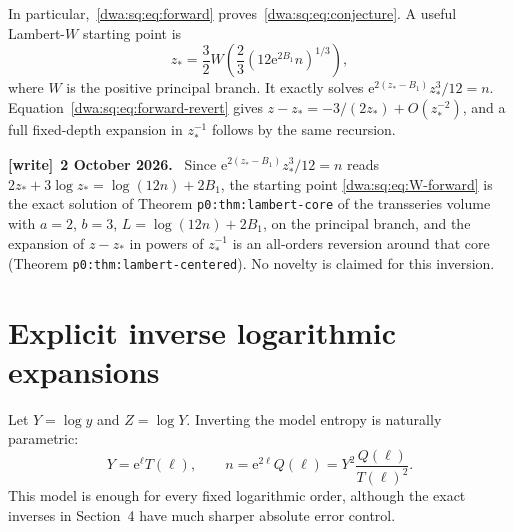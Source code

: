 \documentclass[11pt,letterpaper]{article}
\numberwithin{equation}{section}
\theoremstyle{remark}
\newcommand{\e}{\mathrm e}
\newenvironment{writenote}[1][]{\par\smallskip\begingroup\small
 \noindent\textbf{[write]}\if\relax\detokenize{#1}\relax\else~\textbf{#1.}\fi\ }%
 {\par\endgroup\smallskip}
\begin{document}
In particular,~\eqref{dwa:sq:eq:forward} proves~\eqref{dwa:sq:eq:conjecture}. A useful Lambert-$W$ starting point is
\begin{equation}\label{dwa:sq:eq:W-forward}
 z_* =\frac32 W\left(\frac23(12\e^{2B_1}n)^{1/3}\right),
\end{equation}
where $W$ is the positive principal branch. It exactly solves $\e^{2(z_*-B_1)}z_*^3/12=n$. Equation~\eqref{dwa:sq:eq:forward-revert} gives $z-z_*=-3/(2z_*)+O(z_*^{-2})$, and a full fixed-depth expansion in $z_*^{-1}$ follows by the same recursion.
\begin{writenote}[2 October 2026]
Since $\e^{2(z_*-B_1)}z_*^3/12=n$ reads $2z_*+3\log z_*=\log(12n)+2B_1$, the starting point \eqref{dwa:sq:eq:W-forward} is the exact solution of Theorem \texttt{p0:thm:lambert-core} of the transseries volume with $a=2$, $b=3$, $L=\log(12n)+2B_1$, on the principal branch, and the expansion of $z-z_*$ in powers of $z_*^{-1}$ is an all-orders reversion around that core (Theorem \texttt{p0:thm:lambert-centered}). No novelty is claimed for this inversion.
\end{writenote}

\section{Explicit inverse logarithmic expansions}
Let $Y=\log y$ and $Z=\log Y$. Inverting the model entropy is naturally parametric:
\begin{equation}\label{dwa:sq:eq:inverse-parametric}
 Y=\e^\ell T(\ell),\qquad
 n=\e^{2\ell}Q(\ell)=Y^2\frac{Q(\ell)}{T(\ell)^2}.
\end{equation}
This model is enough for every fixed logarithmic order, although the exact inverses in Section~4 have much sharper absolute error control.
\end{document}
